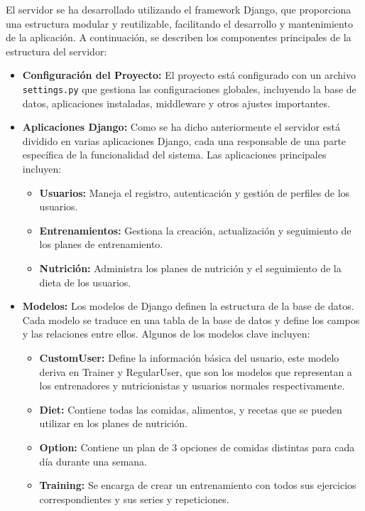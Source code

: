 El servidor se ha desarrollado utilizando el framework Django, que proporciona una estructura modular y reutilizable, facilitando el desarrollo y mantenimiento de la aplicación. A continuación, se describen los componentes principales de la estructura del servidor:

\begin{itemize}
    \item \textbf{Configuración del Proyecto:} El proyecto está configurado con un archivo \texttt{settings.py} que gestiona las configuraciones globales, incluyendo la base de datos, aplicaciones instaladas, middleware y otros ajustes importantes.

    \item \textbf{Aplicaciones Django:} Como se ha dicho anteriormente el servidor está dividido en varias aplicaciones Django, cada una responsable de una parte específica de la funcionalidad del sistema. Las aplicaciones principales incluyen:
    \begin{itemize}
        \item \textbf{Usuarios:} Maneja el registro, autenticación y gestión de perfiles de los usuarios.
        \item \textbf{Entrenamientos:} Gestiona la creación, actualización y seguimiento de los planes de entrenamiento.
        \item \textbf{Nutrición:} Administra los planes de nutrición y el seguimiento de la dieta de los usuarios.
    \end{itemize}

    \item \textbf{Modelos:} Los modelos de Django definen la estructura de la base de datos. Cada modelo se traduce en una tabla de la base de datos y define los campos y las relaciones entre ellos. Algunos de los modelos clave incluyen:
    \begin{itemize}
        \item \textbf{CustomUser:} Define la información básica del usuario, este modelo deriva en Trainer y RegularUser, que son los modelos que representan a los entrenadores y nutricionistas y usuarios normales respectivamente.
        \item \textbf{Diet:} Contiene todas las comidas, alimentos, y recetas que se pueden utilizar en los planes de nutrición.
        \item \textbf{Option:} Contiene un plan de 3 opciones de comidas distintas para cada día durante una semana.
        \item \textbf{Training:} Se encarga de crear un entrenamiento con todos sus ejercicios correspondientes y sus series y repeticiones.
    \end{itemize}


\end{itemize}
